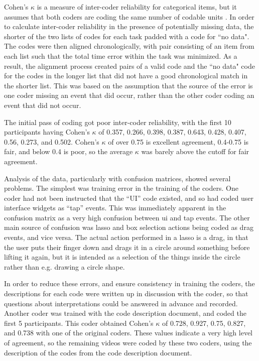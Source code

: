 Cohen's $\kappa$ is a measure of inter-coder reliability for categorical items, but it assumes that both coders are coding the same number of codable units \citep{cohen1960coefficient}. 
In order to calculate inter-coder reliability in the presence of potentially missing data, the  shorter of the two lists of codes for each task padded with a code for ``no data". 
The codes were then aligned chronologically, with pair consisting of an item from each list such that the total time error within the task was minimized.
As a result, the alignment process created pairs of a valid code and the ``no data" code for the codes in the longer list that did not have a good chronological match in the shorter list.
This was based on the assumption that the source of the error is one coder missing an event that did occur, rather than the other coder coding an event that did not occur. 

The initial pass of coding got poor inter-coder reliability, with the first 10 participants having Cohen's $\kappa$ of 0.357, 0.266, 0.398, 0.387, 0.643, 0.428, 0.407, 0.56, 0.273, and 0.502. 
Cohen's $\kappa$ of over 0.75 is excellent agreement, 0.4-0.75 is fair, and below 0.4 is poor, so the average $\kappa$ was barely above the cutoff for fair agreement. 

Analysis of the data, particularly with confusion matrices, showed several problems. 
The simplest was training error in the training of the coders.
One coder had not been instructed that the ``UI'' code existed, and so had coded user interface widgets as ``tap'' events.   
This was immediately apparent in the confusion matrix as a very high confusion between ui and tap events. 
The other main source of confusion was lasso and box selection actions being coded as drag events, and vice versa.
The actual action performed in a lasso is a drag, in that the user puts their finger down and drags it in a circle around something before lifting it again, but it is intended as a selection of the things inside the circle rather than e.g. drawing a circle shape. 

In order to reduce these errors, and ensure consistency in training the coders, the descriptions for each code were written up in discussion with the coder, so that questions about interpretations could be answered in advance and recorded. 
Another coder was trained with the code description document, and coded the first 5 participants. 
This coder obtained Cohen's $\kappa$ of 0.728, 0.927, 0.75, 0.827, and 0.738 with one of the original coders.
These values indicate a very high level of agreement, so the remaining videos were coded by these two coders, using the description of the codes from the code description document.  

